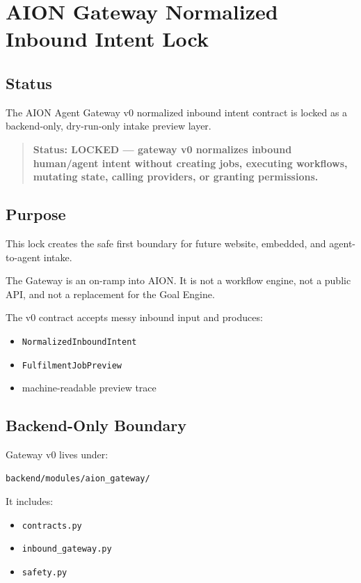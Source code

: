 \section{AION Gateway Normalized Inbound Intent Lock}
\label{sec:aion-gateway-normalized-inbound-intent-lock}

\subsection{Status}

The AION Agent Gateway v0 normalized inbound intent contract is locked as a backend-only, dry-run-only intake preview layer.

\begin{quote}
\textbf{Status: LOCKED --- gateway v0 normalizes inbound human/agent intent without creating jobs, executing workflows, mutating state, calling providers, or granting permissions.}
\end{quote}

\subsection{Purpose}

This lock creates the safe first boundary for future website, embedded, and agent-to-agent intake.

The Gateway is an on-ramp into AION. It is not a workflow engine, not a public API, and not a replacement for the Goal Engine.

The v0 contract accepts messy inbound input and produces:

\begin{itemize}
  \item \texttt{NormalizedInboundIntent}
  \item \texttt{FulfilmentJobPreview}
  \item machine-readable preview trace
\end{itemize}

\subsection{Backend-Only Boundary}

Gateway v0 lives under:

\begin{verbatim}
backend/modules/aion_gateway/
\end{verbatim}

It includes:

\begin{itemize}
  \item \texttt{contracts.py}
  \item \texttt{inbound\_gateway.py}
  \item \texttt{safety.py}
\end{itemize}

